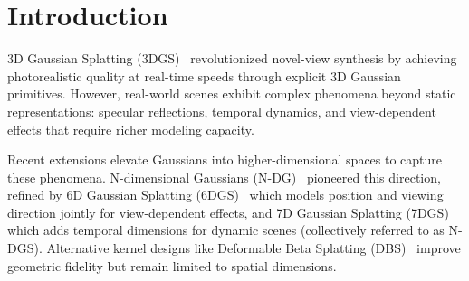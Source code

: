 \documentclass{article}
\newcommand{\modelname}{\textit{d}GS}
\theoremstyle{plain}
\theoremstyle{definition}
\theoremstyle{remark}
\begin{document}

\printAffiliationsAndNotice{}  %
\begin{abstract}
   High-dimensional Gaussian Splatting (N-DGS) methods like 6DGS and 7DGS achieve impressive view- and temporal-dependent modeling through conditional N-dimensional Gaussians. However, their monolithic covariance design derives all conditioning effects from a joint covariance matrix, requiring matrix inversions, regression multiplications, and covariance corrections per Gaussian in every forward pass. We introduce \modelname{}, which replaces this implicit derivation with direct parameterization: opacity modulation via Cholesky precision factors and position shifts via displacement matrices with learnable per-dimension coupling strengths. This eliminates matrix inversions and covariance corrections, achieving 5--6$\times$ faster slicing kernels and up to 2.66$\times$ faster end-to-end rendering. Across five benchmarks spanning static, dynamic, and specular scenes, \modelname{} consistently matches or exceeds N-DGS quality on every dataset (up to +0.97 dB on Mip-NeRF 360), offering a principled, efficient alternative to covariance-derived conditioning in high-dimensional Gaussian splatting.
\end{abstract}

\section{Introduction}
\label{sec:introduction}
3D Gaussian Splatting (3DGS)~\citep{3dgs} revolutionized novel-view synthesis by achieving photorealistic quality at real-time speeds through explicit 3D Gaussian primitives. However, real-world scenes exhibit complex phenomena beyond static representations: specular reflections, temporal dynamics, and view-dependent effects that require richer modeling capacity.

Recent extensions elevate Gaussians into higher-dimensional spaces to capture these phenomena. N-dimensional Gaussians (N-DG)~\citep{diolatzis2024n} pioneered this direction, refined by 6D Gaussian Splatting (6DGS)~\citep{gao20246dgs} which models position and viewing direction jointly for view-dependent effects, and 7D Gaussian Splatting (7DGS)~\citep{gao20257dgs} which adds temporal dimensions for dynamic scenes (collectively referred to as N-DGS). Alternative kernel designs like Deformable Beta Splatting (DBS)~\citep{liu2025deformable} improve geometric fidelity but remain limited to spatial dimensions.
\end{document}
